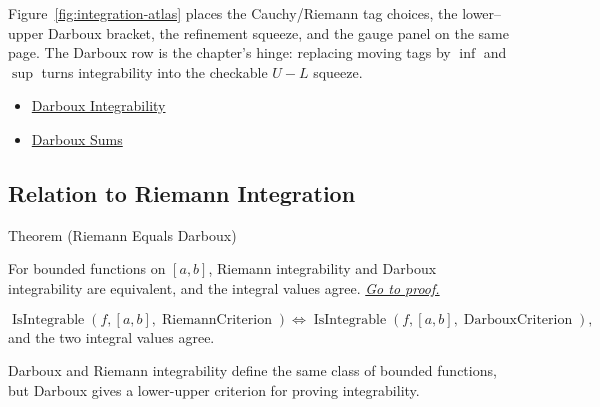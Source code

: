 \begin{remark*}[Interpretation]
Figure~\ref{fig:integration-atlas} places the Cauchy/Riemann tag choices,
the lower--upper Darboux bracket, the refinement squeeze, and the gauge panel
on the same page. The Darboux row is the chapter's hinge: replacing moving
tags by \(\inf\) and \(\sup\) turns integrability into the checkable
\(U-L\) squeeze.
\end{remark*}

\begin{dependencies}
\begin{itemize}
  \item \hyperref[def:darboux-integrability]{Darboux Integrability}
  \item \hyperref[def:darboux-sums]{Darboux Sums}
\end{itemize}
\end{dependencies}



\subsection*{Relation to Riemann Integration}

\begin{theorembox}{Theorem (Riemann Equals Darboux)}
\begin{theorem}
\label{thm:riemann-darboux-equivalence}
For bounded functions on \([a,b]\), Riemann integrability and Darboux
integrability are equivalent, and the integral values agree.
\hyperref[prf:riemann-darboux-equivalence]{\textit{Go to proof.}}
\end{theorem}
\end{theorembox}

\begin{remark*}
\[
\operatorname{IsIntegrable}(f,[a,b],\operatorname{RiemannCriterion})
\Longleftrightarrow
\operatorname{IsIntegrable}(f,[a,b],\operatorname{DarbouxCriterion}),
\]
and the two integral values agree.
\end{remark*}

\begin{remark*}[Interpretation]
Darboux and Riemann integrability define the same class of bounded functions,
but Darboux gives a lower-upper criterion for proving integrability.
\end{remark*}

